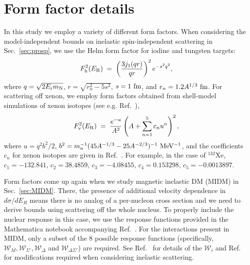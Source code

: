 \documentclass[11pt]{article}
\begin{document}
\appendix

\section{Form factor details}
\label{app:formfactor}

In this study we employ a variety of different form factors. When considering the model-independent bounds on inelastic spin-independent scattering in Sec.~\ref{sec:prosp}, we use the Helm form factor for iodine and tungsten targets:
\begin{equation}
F_{\rm h}^2(E_{\rm R}) \; = \; \left(\frac{3 j_1(q r)}{q r} \right)^2 e^{-s^2q^2},
\label{eq:helm}
\end{equation}
where $q = \sqrt{2 E_{\rm r} m_{\rm N}}$, $r=\sqrt{r_n^2 -5s^2}$, $s=1~{\rm fm}$, and $r_n=1.2 A^{1/3} ~{\rm fm}$. For scattering off xenon, we employ form factors obtained from shell-model simulations of xenon isotopes (see e.g. Ref.~\cite{Fitzpatrick:2012ix}),
\begin{equation}
F_{\rm v}^2(E_{\rm R}) \; = \; \frac{e^{-u}}{A^2} \left(A + \sum_{n=1}^5 c_n u^n \right)^2,
\label{eq:hax}
\end{equation}
where $u=q^2b^2/2$, $b^2=m_n^{-1}(45A^{-1/3}-25A^{-2/3})^{-1}~{\rm MeV^{-1}}$, and the coefficients $c_n$ for xenon isotopes are given in Ref.~\cite{Vietze:2014vsa}. For example, in the case of $^{132}$Xe, $c_1= -132.841$, $c_2= 38.4859$, $c_3= -4.08455$, $c_4= 0.153298$, $c_5= -0.0013897$.

Form factors come up again when we study magnetic inelastic DM (MIDM) in Sec.~\ref{sec:MIDM}. There, the presence of additional velocity dependence in $d\sigma/dE_R$ means there is no analog of a per-nucleon cross section and we need to derive bounds using scattering off the whole nucleus. To properly include the nuclear response in this case, we use the response functions provided in the Mathematica notebook accompanying Ref.~\cite{Anand:2013yka}. For the interactions present in MIDM, only a subset of the 8 possible response functions (specifically, $\mathcal W_M, \mathcal W_{\Sigma'}, \mathcal W_{\Delta}$ and $\mathcal W_{\Delta\Sigma'}$) are required. See Ref.~\cite{Anand:2013yka} for details of the $\mathcal W_i$ and Ref.~\cite{Barello:2014uda} for modifications required when considering inelastic scattering.





\end{document}
